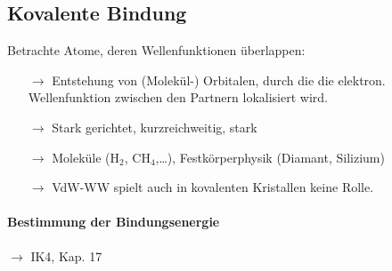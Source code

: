 \subsection{Kovalente Bindung} \label{kap:1_4} %
Betrachte Atome, deren Wellenfunktionen überlappen:
\begin{itemize}
	\item[$\rightarrow$] Entstehung von (Molekül-) Orbitalen, durch die die elektron. Wellenfunktion zwischen den Partnern lokalisiert wird.
	\item[$\rightarrow$] Stark gerichtet, kurzreichweitig, stark
	\item[$\rightarrow$] Moleküle (H$_2$, CH$_4$,\dots), Festkörperphysik (Diamant, Silizium)
	\item[$\rightarrow$] VdW-WW spielt auch in kovalenten Kristallen keine Rolle. 
\end{itemize}
\paragraph{Bestimmung der Bindungsenergie}
$\rightarrow$ IK4, Kap. 17

